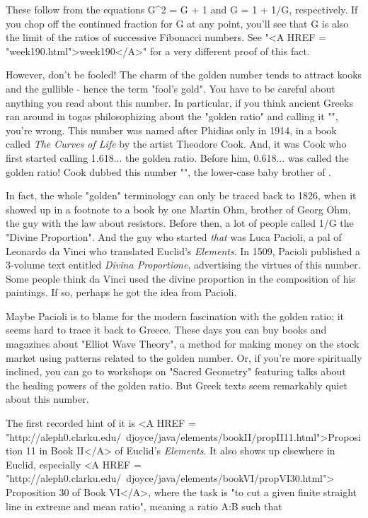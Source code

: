 These follow from the equations G^{2} = G + 1 and G = 1 + 1/G, respectively.
If you chop off the continued fraction for G at any point, you'll see that 
G is also the limit of the ratios of successive Fibonacci numbers.   See 
"<A HREF = "week190.html">week190</A>" for a very different proof of this fact.

However, don't be fooled!  The charm of the golden number tends to attract  
kooks and the gullible - hence the term "fool's gold".  You have to be 
careful about anything you read about this number.  In particular, if you 
think ancient Greeks ran around in togas philosophizing about the "golden 
ratio" and calling it "\Phi ", you're wrong.  This number was named \Phi  
after Phidias only in 1914, in a book called \emph{The Curves of Life} 
by the artist Theodore Cook.  And, it was Cook who first started calling 
1.618...  the golden ratio.  Before him, 0.618... was called the golden ratio!  Cook dubbed this number "\phi ", the lower-case baby brother of \Phi .  

In fact, the whole "golden" terminology can only be traced back to 
1826, when it showed up in a footnote to a book by one Martin Ohm, brother of 
Georg Ohm, the guy with the law about resistors.  Before then, a lot of
people called 1/G the "Divine Proportion".  And the guy who started
\emph{that} 
was Luca Pacioli, a pal of Leonardo da Vinci who translated Euclid's 
\emph{Elements}.  In 1509, Pacioli published a 3-volume text entitled 
\emph{Divina Proportione}, 
advertising the virtues of this number.  Some people think 
da Vinci used the divine proportion in the composition of his paintings.  
If so, perhaps he got the idea from Pacioli.

Maybe Pacioli is to blame for the modern fascination with the golden
ratio; it seems hard to trace it back to Greece.  These days you can buy 
books and magazines about "Elliot Wave Theory", a method for making money 
on the stock market using patterns related to the golden number.  Or, if
you're more spiritually inclined, you can go to workshops on "Sacred 
Geometry" featuring talks about the healing powers of the golden ratio.  
But Greek texts seem remarkably quiet about this number.  

The first recorded hint of it is <A HREF = "http://aleph0.clarku.edu/~djoyce/java/elements/bookII/propII11.html">Proposition 11 in Book II</A> of Euclid's 
\emph{Elements}.  It also shows up elsewhere in Euclid, especially 
<A HREF = "http://aleph0.clarku.edu/~djoyce/java/elements/bookVI/propVI30.html">
Proposition 
30 of Book VI</A>, where the task is "to cut a given finite straight line in
extreme and mean ratio", meaning a ratio A:B such that

